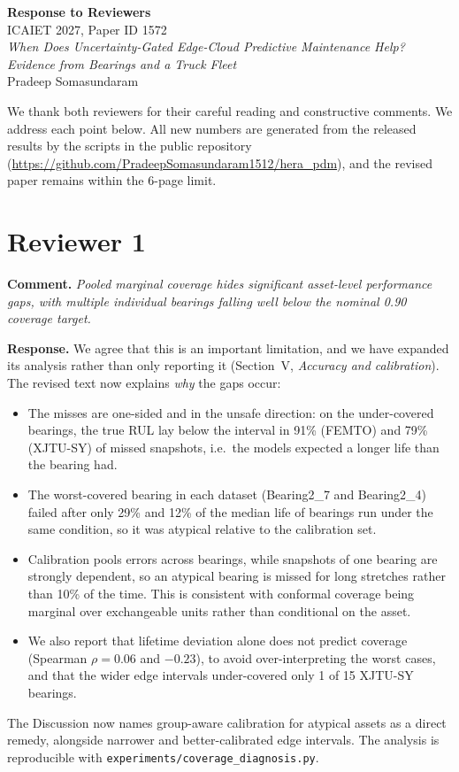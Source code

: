 \documentclass[11pt]{article}
\newcommand{\rc}[1]{\par\medskip\textbf{Comment.} \emph{#1}\par}
\newcommand{\rs}{\textbf{Response.} }
\begin{document}
\begin{center}
{\large\textbf{Response to Reviewers}}\\[4pt]
ICAIET 2027, Paper ID 1572\\
\emph{When Does Uncertainty-Gated Edge-Cloud Predictive Maintenance Help? Evidence from Bearings and a Truck Fleet}\\
Pradeep Somasundaram
\end{center}

We thank both reviewers for their careful reading and constructive comments. We address each point below. All new numbers are generated from the released results by the scripts in the public repository (\url{https://github.com/PradeepSomasundaram1512/hera_pdm}), and the revised paper remains within the 6-page limit.

\section*{Reviewer 1}

\rc{Pooled marginal coverage hides significant asset-level performance gaps, with multiple individual bearings falling well below the nominal 0.90 coverage target.}

\rs We agree that this is an important limitation, and we have expanded its analysis rather than only reporting it (Section~V, \emph{Accuracy and calibration}). The revised text now explains \emph{why} the gaps occur:
\begin{itemize}[leftmargin=*,itemsep=1pt]
\item The misses are one-sided and in the unsafe direction: on the under-covered bearings, the true RUL lay below the interval in 91\% (FEMTO) and 79\% (XJTU-SY) of missed snapshots, i.e.\ the models expected a longer life than the bearing had.
\item The worst-covered bearing in each dataset (Bearing2\_7 and Bearing2\_4) failed after only 29\% and 12\% of the median life of bearings run under the same condition, so it was atypical relative to the calibration set.
\item Calibration pools errors across bearings, while snapshots of one bearing are strongly dependent, so an atypical bearing is missed for long stretches rather than 10\% of the time. This is consistent with conformal coverage being marginal over exchangeable units rather than conditional on the asset.
\item We also report that lifetime deviation alone does not predict coverage (Spearman $\rho=0.06$ and $-0.23$), to avoid over-interpreting the worst cases, and that the wider edge intervals under-covered only 1 of 15 XJTU-SY bearings.
\end{itemize}
The Discussion now names group-aware calibration for atypical assets as a direct remedy, alongside narrower and better-calibrated edge intervals. The analysis is reproducible with \texttt{experiments/coverage\_diagnosis.py}.
\end{document}
